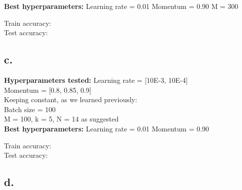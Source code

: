\documentclass{article}
\newcommand{\1}{\mathbf{1}}
\begin{document}
{%

\textbf{Best hyperparameters:}
Learning rate = 0.01
Momentum = 0.90
M = 300


Train accuracy: \\
Test accuracy: 

\subsection*{c.}

\textbf{Hyperparameters tested:}
Learning rate = [10E-3, 10E-4] \\
Momentum = [0.8, 0.85, 0.9] \\
Keeping constant, as we learned previously: \\
Batch size = 100 \\
M = 100, k = 5, N = 14 as suggested \\



\textbf{Best hyperparameters:}
Learning rate = 0.01
Momentum = 0.90


Train accuracy: \\
Test accuracy: 

\subsection*{d.}

}
\end{document}
